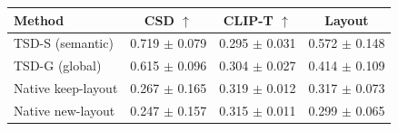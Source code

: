\begin{tabular}{lccc}
\toprule
Method & CSD $\uparrow$ & CLIP-T $\uparrow$ & Layout \\
\midrule
TSD-S (semantic) & 0.719 $\pm$ 0.079 & 0.295 $\pm$ 0.031 & 0.572 $\pm$ 0.148 \\
TSD-G (global) & 0.615 $\pm$ 0.096 & 0.304 $\pm$ 0.027 & 0.414 $\pm$ 0.109 \\
Native keep-layout & 0.267 $\pm$ 0.165 & 0.319 $\pm$ 0.012 & 0.317 $\pm$ 0.073 \\
Native new-layout & 0.247 $\pm$ 0.157 & 0.315 $\pm$ 0.011 & 0.299 $\pm$ 0.065 \\
\bottomrule
\end{tabular}
